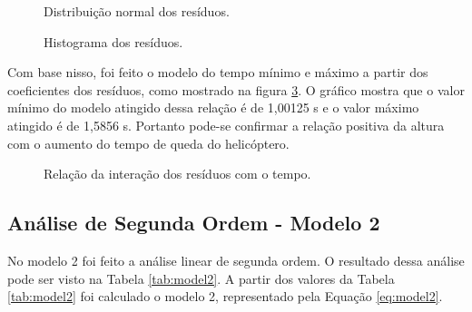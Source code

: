 \begin{figure}
    \centering
    \caption{Distribuição normal dos resíduos.}
    
    \label{fig:qq}
\end{figure}

\begin{figure}
    \centering
    \caption{Histograma dos resíduos.}
    
    \label{fig:hist}
\end{figure}

Com base nisso, foi feito o modelo do tempo mínimo e máximo a partir dos coeficientes dos resíduos, como mostrado na figura \ref{fig:residuos}. O gráfico mostra que o valor mínimo do modelo atingido dessa relação é de 1,00125 s e o valor máximo atingido é de 1,5856 s. Portanto pode-se confirmar a relação positiva da altura com o aumento do tempo de queda do helicóptero.

\begin{figure}
  \centering
  \caption{Relação da interação dos resíduos com o tempo.}
  
  \label{fig:residuos}
\end{figure}

\subsection{Análise de Segunda Ordem - Modelo 2}

No modelo 2 foi feito a análise linear de segunda ordem. O resultado dessa análise pode ser visto na Tabela \ref{tab:model2}. A partir dos valores da Tabela \ref{tab:model2} foi calculado o modelo 2, representado pela Equação \ref{eq:model2}.

